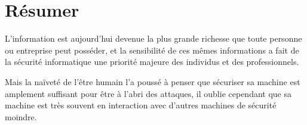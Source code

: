         
        
        


    
    
    





\section*{Résumer} 
L’information est aujourd’hui devenue la plus grande richesse que toute personne ou entreprise peut posséder, et la sensibilité de ces mêmes informations a fait de la sécurité informatique une priorité majeure des individus et des professionnels.

Mais la naïveté de l’être humain l’a poussé à penser que sécuriser sa machine est amplement suffisant pour être à l’abri des attaques, il oublie cependant que sa machine est très souvent en interaction avec d’autres machines de sécurité moindre.

